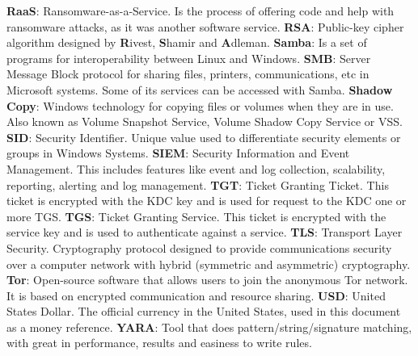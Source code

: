 \linej
\linej
\textbf{RaaS}: Ransomware-as-a-Service. Is the process of offering code and help with ransomware attacks, as it was another software service.
\linej
\linej
\textbf{RSA}: Public-key cipher algorithm designed by \textbf{R}ivest, \textbf{S}hamir and \textbf{A}dleman.
\linej
\linej
\textbf{Samba}: Is a set of programs for interoperability between Linux and Windows.
\linej
\linej
\textbf{SMB}: Server Message Block protocol for sharing files, printers, communications, etc in Microsoft systems. Some of its services can be accessed with Samba.
\linej
\linej
\textbf{Shadow Copy}: Windows technology for copying files or volumes when they are in use. Also known as Volume Snapshot Service, Volume Shadow Copy Service or VSS.
\linej
\linej
\textbf{SID}: Security Identifier. Unique value used to differentiate security elements or groups in Windows Systems.
\linej
\linej
\textbf{SIEM}: Security Information and Event Management. This includes features like event and log collection, scalability, reporting, alerting and log management.
\linej
\linej
\textbf{TGT}: Ticket Granting Ticket. This ticket is encrypted with the KDC key and is used for request to the KDC one or more TGS.
\linej
\linej
\textbf{TGS}: Ticket Granting Service. This ticket is encrypted with the service key and is used to authenticate against a service.
\linej
\linej
\textbf{TLS}: Transport Layer Security. Cryptography protocol designed to provide communications security over a computer network with hybrid (symmetric and asymmetric) cryptography.
\linej
\linej
\textbf{Tor}: Open-source software that allows users to join the anonymous Tor network. It is based on encrypted communication and resource sharing.
\linej
\linej
\textbf{USD}: United States Dollar. The official currency in the United States, used in this document as a money reference.
\linej
\linej
\textbf{YARA}: Tool that does pattern/string/signature matching, with great in performance, results and easiness to write rules.
\linej
\linej
